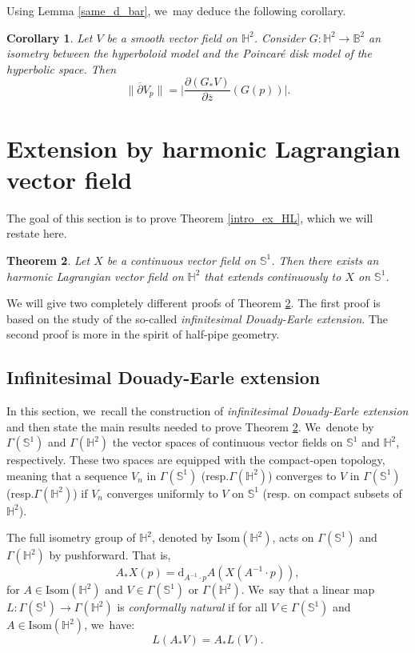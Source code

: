 \documentclass[11pt]{article}
\newcommand{\resp}{resp.\xspace}
\theoremstyle{plain}
\newtheorem{cor}{Corollary}[section]
\newtheorem{theorem}[cor]{Theorem}
\theoremstyle{definition}
\begin{document}
Using Lemma \ref{same_d_bar}, we~may deduce the following corollary.
\begin{cor}\label{d_bar_isometry}
Let \(V \) be a smooth vector field on \(\mathbb{H}^2\). Consider \(G:\mathbb{H}^2 \to \mathbb{B}^2 \) an isometry between the hyperboloid model and the Poincaré disk model of the hyperbolic space. Then
\[
\lVert \overline{\partial} V_p \rVert = \bigg| \frac{\partial (G_*V)}{\partial \overline{z}}(G(p)) \bigg|.
\]
\end{cor}

\section{Extension by harmonic Lagrangian vector field}\label{sec6_extension}
The goal of this section is to prove Theorem \ref{intro_ex_HL}, which we will restate here.
\begin{theorem}\label{THHL_Existence}
Let $X$ be a continuous vector field on $\mathbb{S}^1$. Then there exists an harmonic Lagrangian vector field on $\mathbb{H}^2$ that extends continuously to $X$ on $\mathbb{S}^1$.
\end{theorem}
We will give two completely different proofs of Theorem \ref{THHL_Existence}. The first proof is based on the study of the so-called \emph{infinitesimal Douady-Earle extension}. The second proof is more in the spirit of half-pipe geometry.

\subsection{Infinitesimal Douady-Earle extension}\label{subsec_inf_DEE}
In this section, we~recall the construction of \emph{infinitesimal Douady-Earle extension} and then state the main results needed to prove Theorem \ref{THHL_Existence}. We~denote by $\Gamma(\mathbb{S}^1)$ and $\Gamma(\mathbb{H}^2)$ the vector spaces of continuous vector fields on $\mathbb{S}^1$ and $\mathbb{H}^2$, respectively. These two spaces are equipped with the compact-open topology, meaning that a sequence $V_n$ in $\Gamma(\mathbb{S}^1)$ (\resp $\Gamma(\mathbb{H}^2)$) converges to $V$ in $\Gamma(\mathbb{S}^1)$ (\resp $\Gamma(\mathbb{H}^2)$) if $V_n$ converges uniformly to $V$ on $\mathbb{S}^1$ (\resp on compact subsets of $\mathbb{H}^2$).

The full isometry group of $\mathbb{H}^2$, denoted by $\mathrm{Isom}(\mathbb{H}^2)$, acts on $\Gamma(\mathbb{S}^1)$ and $\Gamma(\mathbb{H}^2)$ by pushforward. That is,
\[
A_* X(p)=\mathrm{d}_{A^{-1}\cdot p}A(X(A^{-1}\cdot p)),
\]
for $A \in \mathrm{Isom}(\mathbb{H}^2)$ and $V \in \Gamma(\mathbb{S}^1)$ or $\Gamma(\mathbb{H}^2)$. We~say that a linear map $L:\Gamma(\mathbb{S}^1) \to \Gamma(\mathbb{H}^2)$ is \emph{conformally natural} if for all $V \in \Gamma(\mathbb{S}^1)$ and $A \in \mathrm{Isom}(\mathbb{H}^2)$, we~have:
\[
L(A_*V)=A_*L(V).
\]
\end{document}
